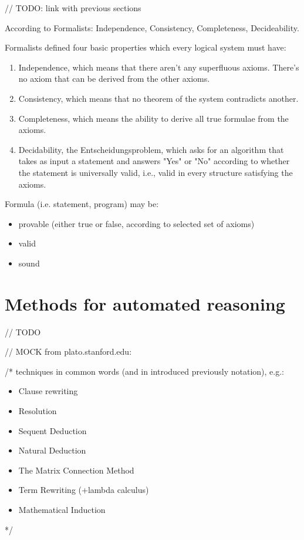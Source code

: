\documentclass[article]{aaltoseries}
\begin{document}
// TODO: link with previous sections

According to Formalists: Independence, Consistency, Completeness, Decideability.

Formalists defined four basic properties which every logical system must have:
\begin{enumerate}
\itemsep0em
\item Independence, which means that there aren’t any superfluous axioms. There’s no axiom that can be derived from the other axioms.
\item Consistency, which means that no theorem of the system contradicts another.
\item Completeness, which means the ability to derive all true formulae from the axioms.
\item Decidability, the Entscheidungsproblem, which asks for an algorithm that takes as input a statement and answers "Yes" or "No" according to whether the statement is universally valid, i.e., valid in every structure satisfying the axioms.
\end{enumerate}

Formula (i.e. statement, program) may be:
\begin{itemize}
\itemsep0em
	\item provable (either true or false, according to selected set of axioms)
	\item valid
	\item sound
\end{itemize}


\section{Methods for automated reasoning}
\label{sec:auto_reasoning}

// TODO

// MOCK from plato.stanford.edu:  %

/* techniques in common words (and in introduced previously notation), e.g.: 
\begin{itemize}
\itemsep0em
	\item Clause rewriting
	\item Resolution
	\item Sequent Deduction
	\item Natural Deduction
	\item The Matrix Connection Method
	\item Term Rewriting (+lambda calculus)
	\item Mathematical Induction
\end{itemize}
*/
\end{document}
